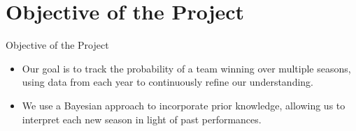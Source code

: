 \section{Objective of the Project}

\begin{frame}{Objective of the Project}

  \begin{itemize}
    \item Our goal is to track the probability of a team winning over multiple seasons, using data from each year to continuously refine our understanding.
    \item We use a Bayesian approach to incorporate prior knowledge, allowing us to interpret each new season in light of past performances.
  \end{itemize}
  
\end{frame}
